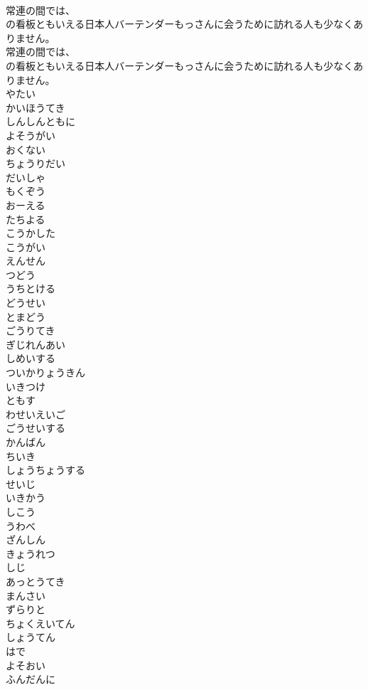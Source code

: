 \documentclass[8pt]{extreport}
\begin{document}
\begin{CJK}{UTF8}{min}
\\	常連の間では、
\\	の看板ともいえる日本人バーテンダーもっさんに会うために訪れる人も少なくありません。
\\	常連の間では、
\\	の看板ともいえる日本人バーテンダーもっさんに会うために訪れる人も少なくありません。
\\	やたい
\\	かいほうてき
\\	しんしんともに
\\	よそうがい
\\	おくない
\\	ちょうりだい
\\	だいしゃ
\\	もくぞう
\\	おーえる
\\	たちよる
\\	こうかした
\\	こうがい
\\	えんせん
\\	つどう
\\	うちとける
\\	どうせい
\\	とまどう
\\	ごうりてき
\\	ぎじれんあい
\\	しめいする
\\	ついかりょうきん
\\	いきつけ
\\	ともす
\\	わせいえいご
\\	ごうせいする
\\	かんばん
\\	ちいき
\\	しょうちょうする
\\	せいじ
\\	いきかう
\\	しこう
\\	うわべ
\\	ざんしん
\\	きょうれつ
\\	しじ
\\	あっとうてき
\\	まんさい
\\	ずらりと
\\	ちょくえいてん
\\	しょうてん
\\	はで
\\	よそおい
\\	ふんだんに

\end{CJK}
\end{document}

